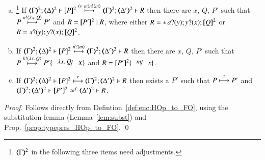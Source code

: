 \begin{proposition}
\begin{enumerate}[a)]
		\item
			\footnote{$(\!\!\langle\Gamma\rangle\!\!)^{2}$ in the following three items need adjustments.}
			If  $\stytra{\mapt{\Gamma}^{2}}{\news{m}\bactout{n}{m}}{\mapt{\Delta}^{2}}{\map{P}^{2}}{\mapt{\Delta'}^{2}}{R}$
			then there are $x$, $Q$, $P'$ such that \\
			$P \stackrel{n ! \langle \lambda x.\,Q \rangle}{\longmapsto} P'$
			and $R = [\!\![P']\!\!]^{2} \;|\; R$, where 
			either
			$R = \ast\,{} a ? (y) ; y ? (x) ; [\!\![Q]\!\!]^{2}$ 
			or $R = s ? (y) ; y ? (x) ; [\!\![Q]\!\!]^{2}$.

		\item   
			If  $\stytra{\mapt{\Gamma}^{2}}{\bactinp{n}{m}}{\mapt{\Delta}^{2}}{\map{P}^{2}}{\mapt{\Delta'}^{2}}{R}$
			then there are $x$, $Q$, $P'$ such that \\
			$P \hby{\bactout{k}{\abs{x}Q}} P'\subst{\abs{x}Q}{X}$
			and $R = \map{P'}^{2}\subst{m}{x}$.
		
		\item   
			If  $\stytra{\mapt{\Gamma}^{2}}{\tau}{\mapt{\Delta}^{2}}{\map{P}^{2}}{\mapt{\Delta'}^{2}}{R}$
			then exists a $P'$ such that 
			$P \stackrel{\tau}{\longmapsto} P'$
			and $\horel{\mapt{\Gamma}^{2}}{\mapt{\Delta'}^{2}}{\map{P'}^{2}}{\wbf}{\mapt{\Delta'}^{2}}{R}$.
	\end{enumerate}
\end{proposition}

\begin{proof}
	Follows directly from Defintion~\ref{def:enc:HOp_to_FO}, using the substitution lemma (Lemma~\ref{lem:subst})
	and Prop.~\ref{prop:typepres_HOp_to_FO}.
	\qed
\end{proof}

\begin{comment}
\begin{proof}[Sketch]
For completeness, we 
consider the \HO process $P = {\bbout{k}{\abs{x} Q} P_1} \Par \binp{k}{X} P_2$. We have that
\[
P \red P_1 \Par P_2 \subst{\abs{x}Q}{X}
\]
In the target language, this reduction is mimicked as follows:
\begin{eqnarray*}
\pmap{P}{2} & = & \newsp{a}{\bout{k}{a} (\pmap{P_1}{3} \Par \repl{} \binp{a}{y} \binp{y}{x} \pmap{Q}{3})\,} 
                  \Par \binp{k}{x} \pmap{P_2}{3} \\
            & \red & \newsp{a}{\pmap{P_1}{3} \Par \repl{} \binp{a}{y} \binp{y}{x} \pmap{Q}{3} 
                  \Par  \pmap{P_2}{3}\subst{a}{x}}
\end{eqnarray*}
\qed
\end{proof}
\end{comment}


